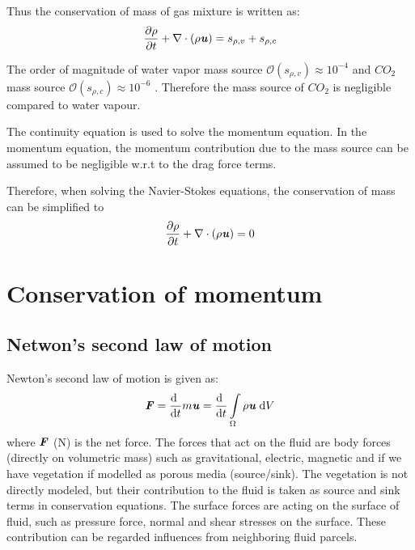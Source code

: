 Thus the conservation of mass of gas mixture is written as:
\begin{equation}
\frac{{\partial {\rho}}}{{\partial t}} + \nabla  \cdot \left( {{\rho }{\textbf{\textit{u}}}} \right) = s_{\rho,v} + s_{\rho,c}
\end{equation}




\begin{assumption}
The order of magnitude of water vapor mass source $\mathcal{O}\left(s_{\rho,v}\right)\approx10^{-4}$ and $CO_2$ mass source $\mathcal{O}\left(s_{\rho,c}\right)\approx10^{-6}$ \citep{Hiraoka2005}. Therefore the mass source of $CO_2$ is negligible compared to water vapour.
\end{assumption}

\begin{assumption}
The continuity equation is used to solve the momentum equation. In the momentum equation, the momentum contribution due to the mass source can be assumed to be negligible w.r.t to the drag force terms.
\end{assumption}

Therefore, when solving the Navier-Stokes equations, the conservation of mass can be simplified to
\begin{equation}
\frac{{\partial {\rho}}}{{\partial t}} + \nabla  \cdot \left( {{\rho }{\textbf{\textit{u}}}}\right) = 0
\end{equation}

\section{Conservation of momentum}
\label{sec:conservationofmomentum}

\subsection{Netwon's second law of motion}
Newton's second law of motion is given as:
\begin{equation}
{\textbf{\textit{F}}} = \frac{\mathrm{d}~}{{\mathrm{d}t}}m{\textbf{\textit{u}}}=\frac{\mathrm{d}~}{{\mathrm{d}t}} \int \limits_\Omega  \rho {\textbf{\textit{u}}}\;\mathrm{d}V
\end{equation}
where $\textbf{\textit{F}}$ (N) is the net force. The forces that act on the fluid are body forces (directly on volumetric mass) such as gravitational, electric, magnetic and if we have vegetation if modelled as porous media (source/sink). The vegetation is not directly modeled, but their contribution to the fluid is taken as source and sink terms in conservation equations. The surface forces are acting on the surface of fluid, such as pressure force, normal and shear stresses on the surface. These contribution can be regarded influences from neighboring fluid parcels.

